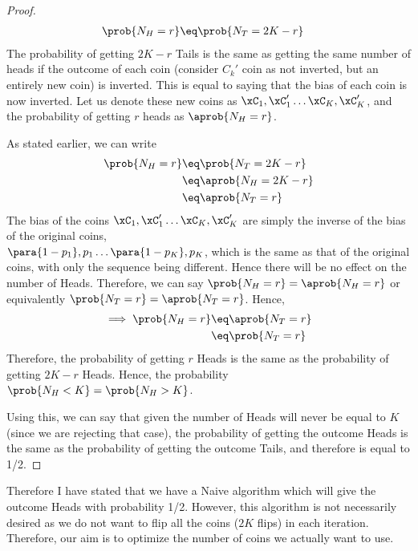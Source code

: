 \documentclass[a4paper,10pt]{article}
\begin{document}
\begin{question}
\begin{claim}
\begin{proof}
			\begin{align*}
				\prob{N_H = r}	&\eq	\prob{N_T = 2K - r}
			\end{align*}
			The probability of getting $2K - r$ Tails is the same as getting the same number of heads if the outcome of each coin (consider $C_k'$ coin as not inverted, but an entirely new coin) is inverted.
			This is equal to saying that the bias of each coin is now inverted.
			Let us denote these new coins as $\xC_1, \xC_1' \dots \xC_K, \xC_K'$, and the probability of getting $r$ heads as $\aprob{N_H = r}$.

			As stated earlier, we can write
			\begin{align*}
				\prob{N_H = r}	&\eq	\prob{N_T = 2K - r}		\\
				&\eq	\aprob{N_H = 2K - r}	\\
				&\eq	\aprob{N_T = r}
			\end{align*}
			The bias of the coins $\xC_1, \xC_1' \dots \xC_K, \xC_K'$ are simply the inverse of the bias of the original coins, \ie \\ $\para{1 - p_1}, p_1 \dots \para{1 - p_K}, p_K$, which is the same as that of the original coins, with only the sequence being different.
			Hence there will be no effect on the number of Heads.
			Therefore, we can say $\prob{N_H = r} = \aprob{N_H = r}$ or equivalently $\prob{N_T = r} = \aprob{N_T = r}$.
			Hence,
			\begin{align*}
				\implies \prob{N_H = r}	&\eq	\aprob{N_T = r} \\
				&\eq	\prob{N_T = r}
			\end{align*}
			Therefore, the probability of getting $r$ Heads is the same as the probability of getting $2K - r$ Heads.
			Hence, the probability $\prob{N_H < K} = \prob{N_H > K}$.

			Using this, we can say that given the number of Heads will never be equal to $K$ (since we are rejecting that case), the probability of getting the outcome Heads is the same as the probability of getting the outcome Tails, and therefore is equal to 1/2.
		\end{proof}
	\end{claim}

	Therefore I have stated that we have a Naive algorithm which will give the outcome Heads with probability 1/2.
	However, this algorithm is not necessarily desired as we do not want to flip all the coins ($2K$ flips) in each iteration.
	Therefore, our aim is to optimize the number of coins we actually want to use.


\end{question}
\end{document}
